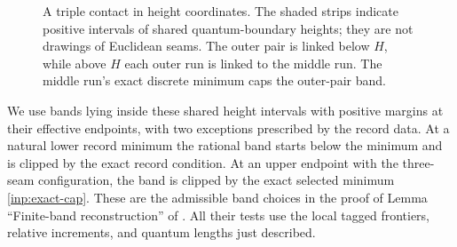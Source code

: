\begin{figure}[htbp]
\centering
{}
\caption{A triple contact in height coordinates.  The shaded strips
indicate positive intervals of shared quantum-boundary heights;
they are not drawings of Euclidean seams.  The outer pair is linked
below $H$, while above $H$ each outer run is linked to the middle
run.  The middle run's exact discrete minimum caps the outer-pair
band.}
\label{inp:triple-figure}
\end{figure}

We use bands lying inside these shared height intervals with positive
margins at their effective endpoints, with two exceptions prescribed
by the record data.  At a natural lower record minimum the rational
band starts below the minimum and is clipped by the exact record
condition.  At an upper endpoint with the three-seam configuration,
the band is clipped by the exact selected minimum
\eqref{inp:exact-cap}.  These are the admissible band choices in
the proof of Lemma ``Finite-band reconstruction'' of
\cite{MetricMaps}.  All their tests use the local tagged frontiers,
relative increments, and quantum lengths just described.

